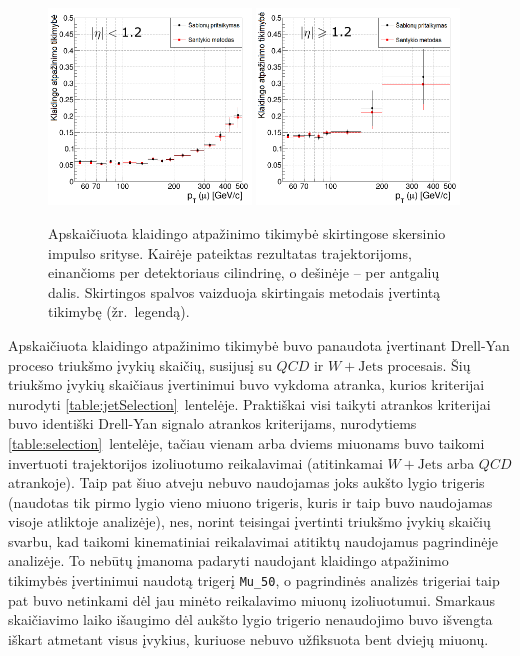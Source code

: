 \documentclass[a4paper, 12pt, oneside]{article}
\newcommand{\ttt}[1]{\texttt{#1}}
\newcommand{\WJets}{W\! +\!\mathrm{Jets}}
\newcommand{\QCD}{QC\! D}
\begin{document}
\begin{figure}[p]
	\includegraphics[width=0.48\textwidth]{Kursinis3/FR_barrel.png}
	\includegraphics[width=0.48\textwidth]{Kursinis3/FR_endcap.png}
	\vspace{-0.3cm}
	\caption{\label{fig:FR}
		Apskaičiuota klaidingo atpažinimo tikimybė skirtingose skersinio impulso srityse.
		Kairėje pateiktas rezultatas trajektorijoms, einančioms per detektoriaus cilindrinę, o dešinėje -- per antgalių dalis.
		Skirtingos spalvos vaizduoja skirtingais metodais įvertintą tikimybę (žr.~legendą).}
\end{figure}

Apskaičiuota klaidingo atpažinimo tikimybė buvo panaudota įvertinant Drell-Yan proceso triukšmo įvykių skaičių, susijusį su
$\QCD$ ir $\WJets$ procesais.
Šių triukšmo įvykių skaičiaus įvertinimui buvo vykdoma atranka, kurios kriterijai nurodyti \ref{table:jetSelection}~lentelėje.
Praktiškai visi taikyti atrankos kriterijai buvo identiški Drell-Yan signalo atrankos kriterijams, nurodytiems
\ref{table:selection}~lentelėje, tačiau vienam arba dviems miuonams buvo taikomi invertuoti trajektorijos izoliuotumo
reikalavimai (atitinkamai $\WJets$ arba $\QCD$ atrankoje).
Taip pat šiuo atveju nebuvo naudojamas joks aukšto lygio trigeris (naudotas tik pirmo lygio vieno miuono trigeris, kuris
ir taip buvo naudojamas visoje atliktoje analizėje), nes, norint teisingai įvertinti triukšmo įvykių skaičių
svarbu, kad taikomi kinematiniai reikalavimai atitiktų naudojamus pagrindinėje analizėje.
To nebūtų įmanoma padaryti naudojant klaidingo atpažinimo tikimybės įvertinimui naudotą trigerį \ttt{Mu\_50},
o pagrindinės analizės trigeriai taip pat buvo netinkami dėl jau minėto reikalavimo miuonų izoliuotumui.
Smarkaus skaičiavimo laiko išaugimo dėl aukšto lygio trigerio nenaudojimo buvo išvengta iškart atmetant visus įvykius,
kuriuose nebuvo užfiksuota bent dviejų miuonų.
\end{document}
